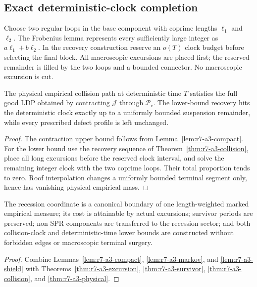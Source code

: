 \subsection{Exact deterministic-clock completion}

Choose two regular loops in the base component with coprime lengths $\ell_1$
and $\ell_2$.  The Frobenius lemma represents every sufficiently large integer
as $a\ell_1+b\ell_2$.  In the recovery construction reserve an $o(T)$ clock
budget before selecting the final block.  All macroscopic excursions are placed
first; the reserved remainder is filled by the two loops and a bounded
connector.  No macroscopic excursion is cut.

\begin{theorem}
\label{thm:r7-a3-physical}
The physical empirical collision path at deterministic time $T$ satisfies the
full good LDP obtained by contracting $\mathcal J$ through
$\mathscr P_c$.  The lower-bound recovery hits the deterministic clock exactly
up to a uniformly bounded suspension remainder, while every prescribed defect
profile is left unchanged.
\end{theorem}

\begin{proof}
The contraction upper bound follows from
Lemma~\ref{lem:r7-a3-compact}.  For the lower bound use the recovery sequence
of Theorem~\ref{thm:r7-a3-collision}, place all long excursions before the
reserved clock interval, and solve the remaining integer clock with the two
coprime loops.  Their total proportion tends to zero.  Roof interpolation
changes a uniformly bounded terminal segment only, hence has vanishing
physical empirical mass.
\end{proof}

\begin{theorem}
\label{thm:r7-a3-main}
The recession coordinate is a canonical boundary of one length-weighted marked
empirical measure; its cost is attainable by actual excursions; survivor
periods are preserved; non-SPR components are transferred to the recession
sector; and both collision-clock and deterministic-time lower bounds are
constructed without forbidden edges or macroscopic terminal surgery.
\end{theorem}

\begin{proof}
Combine Lemmas~\ref{lem:r7-a3-compact},
\ref{lem:r7-a3-markov}, and
\ref{lem:r7-a3-shield} with
Theorems~\ref{thm:r7-a3-excursion},
\ref{thm:r7-a3-survivor},
\ref{thm:r7-a3-collision}, and
\ref{thm:r7-a3-physical}.
\end{proof}
